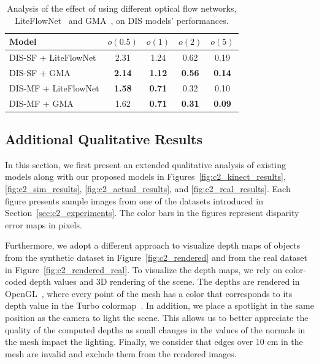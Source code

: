 \begin{table}[t]
    \begin{center}
        \begin{tabular}{lcccc}
        \hline
        Model & $o(0.5)$ & $o(1)$ & $o(2)$ & $o(5)$ \\
        \hline
        DIS-SF + LiteFlowNet & 2.31 & 1.24 & 0.62 & 0.19 \\
        DIS-SF + GMA & \textbf{2.14} & \textbf{1.12} & \textbf{0.56} & \textbf{0.14} \\
        \hline
        DIS-MF + LiteFlowNet & \textbf{1.58} & \textbf{0.71} & 0.32 & 0.10 \\
        DIS-MF + GMA & 1.62 & \textbf{0.71} & \textbf{0.31} & \textbf{0.09} \\
        \hline
        \end{tabular}
    \end{center}
    \caption{Analysis of the effect of using different optical flow networks, LiteFlowNet~\citep{hui2018liteflownet} and GMA~\citep{jiang2021learning}, on DIS models' performances.}
    \label{table:ablation_gma}
\end{table}

\subsection{Additional Qualitative Results} \label{sec:c2_additional_results}
In this section, we first present an extended qualitative analysis of existing models along with our proposed models in Figures~\ref{fig:c2_kinect_results}, \ref{fig:c2_sim_results}, \ref{fig:c2_actual_results}, and \ref{fig:c2_real_results}. Each figure presents sample images from one of the datasets introduced in Section~\ref{sec:c2_experiments}. The color bars in the figures represent disparity error maps in pixels.

Furthermore, we adopt a different approach to visualize depth maps of objects from the synthetic dataset in Figure~\ref{fig:c2_rendered} and from the real dataset in Figure~\ref{fig:c2_rendered_real}. To visualize the depth maps, we rely on color-coded depth values and 3D rendering of the scene. The depths are rendered in OpenGL~\citep{shreiner2013opengl}, where every point of the mesh has a color that corresponds to its depth value in the Turbo colormap~\citep{mikhailov2019turbo}. In addition, we place a spotlight in the same position as the camera to light the scene. This allows us to better appreciate the quality of the computed depths as small changes in the values of the normals in the mesh impact the lighting. Finally, we consider that edges over 10 cm in the mesh are invalid and exclude them from the rendered images.

